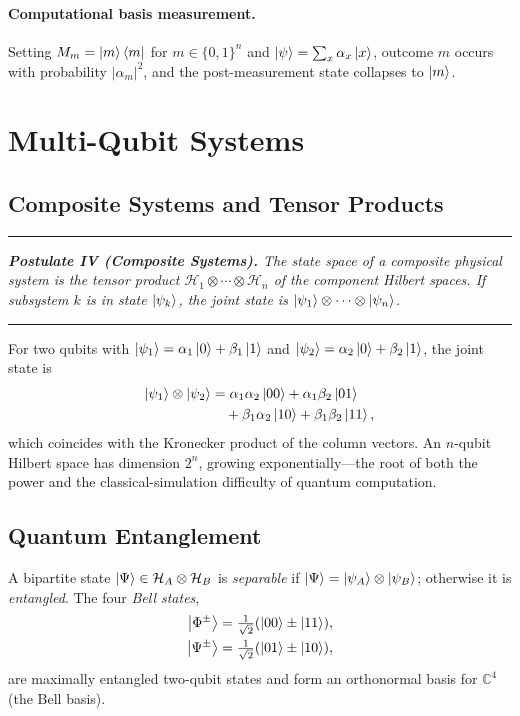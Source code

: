 \documentclass[aps, reprint, twocolumn, superscriptaddress, floatfix]{revtex4-2}
\newenvironment{statement}{%
  \par\addvspace{5pt}%
  \noindent\rule{\linewidth}{0.4pt}\nopagebreak\par\vspace{2pt}%
  \noindent\begingroup\small\itshape}{%
  \endgroup\par\vspace{2pt}\nopagebreak%
  \noindent\rule{\linewidth}{0.4pt}\par\addvspace{5pt}}
\begin{document}
\paragraph{Computational basis measurement.}
Setting $M_m = \ket{m}\bra{m}$ for $m \in \{0,1\}^n$ and
$\ket{\psi} = \sum_x \alpha_x\ket{x}$, outcome $m$ occurs with probability
$|\alpha_m|^2$, and the post-measurement state collapses to $\ket{m}$.

\section{Multi-Qubit Systems}
\label{sec:multiqubit}

\subsection{Composite Systems and Tensor Products}
\label{ssec:composite}

\begin{statement}
\textbf{Postulate IV (Composite Systems).}
The state space of a composite physical system is the tensor product
$\mathcal{H}_1 \otimes \cdots \otimes \mathcal{H}_n$ of the component Hilbert spaces.
If subsystem $k$ is in state $\ket{\psi_k}$, the joint state is
$\ket{\psi_1}\otimes\cdots\otimes\ket{\psi_n}$.
\end{statement}

For two qubits with $\ket{\psi_1} = \alpha_1\ket{0}+\beta_1\ket{1}$ and
$\ket{\psi_2} = \alpha_2\ket{0}+\beta_2\ket{1}$, the joint state is
\begin{align}
  \ket{\psi_1}\otimes\ket{\psi_2} &=
    \alpha_1\alpha_2\ket{00} + \alpha_1\beta_2\ket{01} \nonumber \\
    &\quad + \beta_1\alpha_2\ket{10} + \beta_1\beta_2\ket{11},
  \label{eq:product}
\end{align}
which coincides with the Kronecker product of the column vectors.  An $n$-qubit
Hilbert space has dimension $2^n$, growing exponentially---the root of both the
power and the classical-simulation difficulty of quantum computation.

\subsection{Quantum Entanglement}
\label{ssec:entanglement}

A bipartite state $\ket{\Psi} \in \mathcal{H}_A \otimes \mathcal{H}_B$ is
\emph{separable} if $\ket{\Psi} = \ket{\psi_A}\otimes\ket{\psi_B}$;
otherwise it is \emph{entangled}.  The four \emph{Bell states},
\begin{align}
  \ket{\Phi^{\pm}} &= \tfrac{1}{\sqrt{2}}(\ket{00} \pm \ket{11}), \\
  \ket{\Psi^{\pm}} &= \tfrac{1}{\sqrt{2}}(\ket{01} \pm \ket{10}),
\end{align}
are maximally entangled two-qubit states and form an orthonormal basis for
$\mathbb{C}^4$ (the Bell basis).
\end{document}

